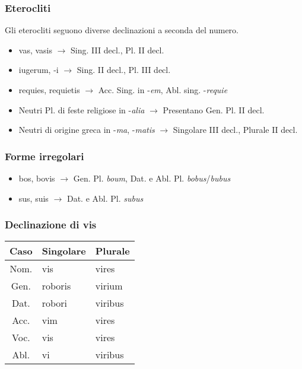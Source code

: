 \subsubsection*{Eterocliti}
Gli eterocliti seguono diverse declinazioni a seconda del numero.
\begin{itemize}
    \item vas, vasis $\rightarrow$ Sing. III decl., Pl. II decl.
    \item iugerum, -i $\rightarrow$ Sing. II decl., Pl. III decl.
    \item requies, requietis $\rightarrow$ Acc. Sing. in -\textit{em}, Abl. sing. -\textit{requie}
    \item Neutri Pl. di feste religiose in -\textit{alia} $\rightarrow$ Presentano Gen. Pl. II decl.
    \item Neutri di origine greca in -\textit{ma}, -\textit{matis} $\rightarrow$ Singolare III decl., Plurale II decl.
\end{itemize}

\subsubsection*{Forme irregolari}
\begin{itemize}
    \item bos, bovis $\rightarrow$ Gen. Pl. \textit{boum}, Dat. e Abl. Pl. \textit{bobus}/\textit{bubus}
    \item sus, suis $\rightarrow$ Dat. e Abl. Pl. \textit{subus}
\end{itemize}

\subsubsection*{Declinazione di vis}
\begin{table}[h!]
    \centering
    \begin{tabular}{|c|l|l|}
        \hline
        \textbf{Caso} & \textbf{Singolare} & \textbf{Plurale} \\
        \hline
        Nom. & vis & vires \\
        \hline
        Gen. & roboris  & virium \\
        \hline
        Dat. & robori  & viribus \\
        \hline
        Acc. & vim & vires \\
        \hline
        Voc. & vis & vires \\
        \hline
        Abl. & vi  & viribus \\
        \hline
    \end{tabular}
\end{table}
\clearpage

